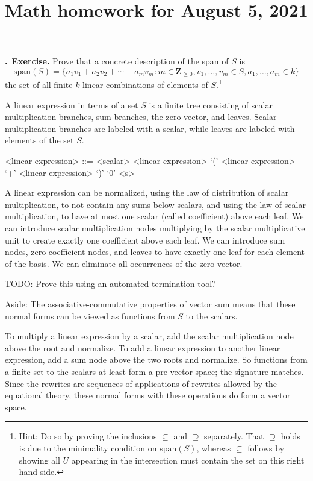 \documentclass[11pt, noamsfonts]{amsart}
\title{Math homework for August 5, 2021}
\newcommand{\pointheader}{\vspace{2mm}\noindent\refstepcounter{section}\textbf{\thesection.}}
\newcommand{\bpoint}[1]{\pointheader~{\bf #1.}}
\begin{document}
\maketitle

\bpoint{Exercise}
Prove that a concrete description of the span of \(S\) is
\[
\mathrm{span}(S) =
\{ a_1v_1 + a_2v_2 + \cdots + a_m v_m :
m \in \mathbf{Z}_{\geq 0},
v_1,\ldots,v_m \in S,
a_1,\ldots,a_m \in k\}
\]
the set of all finite \(k\)-linear combinations of elements of \(S\).\footnote{Hint:
Do so by proving the inclusions \(\subseteq\) and \(\supseteq\) separately.
That \(\supseteq\) holds is due to the minimality condition on
\(\mathrm{span}(S)\), whereas \(\subseteq\) follows by showing all \(U\)
appearing in the intersection must contain the set on this right hand side.}

A linear expression in terms of a set \(S\) is a finite tree consisting of scalar multiplication branches, sum branches, the zero vector, and leaves. Scalar multiplication branches are labeled with a scalar, while leaves are labeled with elements of the set \(S\).

\begin{grammar}

<linear expression> ::= <scalar> <linear expression> 
\alt `(' <linear expression> `+' <linear expression> `)'
\alt `0'
\alt <s>

\end{grammar}

A linear expression can be normalized, using the law of distribution of scalar multiplication, to not contain any sums-below-scalars, and using the law of scalar multiplication, to have at most one scalar (called coefficient) above each leaf. We can introduce scalar multiplication nodes multiplying by the scalar multiplicative unit to create exactly one coefficient above each leaf.  We can introduce sum nodes, zero coefficient nodes, and leaves to have exactly one leaf for each element of the basis. We can eliminate all occurrences of the zero vector. 

TODO: Prove this using an automated termination tool?

Aside: The associative-commutative properties of vector sum means that these normal forms can be viewed as functions from \(S\) to the scalars.

To multiply a linear expression by a scalar, add the scalar multiplication node above the root and normalize. To add a linear expression to another linear expression, add a sum node above the two roots and normalize. So functions from a finite set to the scalars at least form a pre-vector-space; the signature matches. Since the rewrites are sequences of applications of rewrites allowed by the equational theory, these normal forms with these operations do form a vector space.
\end{document}
